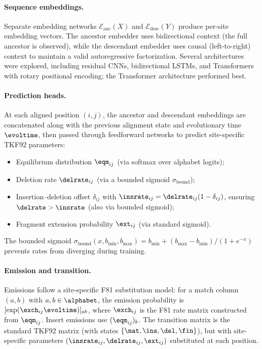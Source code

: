 \paragraph{Sequence embeddings.}
Separate embedding networks $\mathcal{E}_{\mathrm{anc}}(X)$
and $\mathcal{E}_{\mathrm{desc}}(Y)$
produce per-site embedding vectors.
The ancestor embedder uses bidirectional context
(the full ancestor is observed),
while the descendant embedder uses causal (left-to-right) context
to maintain a valid autoregressive factorization.
Several architectures were explored, including residual CNNs,
bidirectional LSTMs, and Transformers with rotary positional encoding;
the Transformer architecture performed best.

\paragraph{Prediction heads.}
At each aligned position $(i, j)$,
the ancestor and descendant embeddings are concatenated
along with the previous alignment state and evolutionary time $\evoltime$,
then passed through feedforward networks to predict site-specific TKF92 parameters:
\begin{itemize}[nosep]
\item Equilibrium distribution $\eqm_{ij}$ (via softmax over alphabet logits);
\item Deletion rate $\delrate_{ij}$ (via a bounded sigmoid $\sigma_{\mathrm{bound}}$);
\item Insertion--deletion offset $\delta_{ij}$ with $\insrate_{ij} = \delrate_{ij}(1 - \delta_{ij})$,
  ensuring $\delrate > \insrate$ (also via bounded sigmoid);
\item Fragment extension probability $\ext_{ij}$ (via standard sigmoid).
\end{itemize}
The bounded sigmoid $\sigma_{\mathrm{bound}}(x, b_{\min}, b_{\max})
= b_{\min} + (b_{\max} - b_{\min}) / (1 + e^{-x})$
prevents rates from diverging during training.

\paragraph{Emission and transition.}
Emissions follow a site-specific F81 substitution model:
for a match column $(a, b)$ with $a, b \in \alphabet$,
the emission probability is $[\exp(\exch_{ij} \evoltime)]_{ab}$,
where $\exch_{ij}$ is the F81 rate matrix constructed from $\eqm_{ij}$.
Insert emissions use $(\eqm_{ij})_b$.
The transition matrix is the standard TKF92 matrix
(with states $\{ \mat, \ins, \del, \fin \}$),
but with site-specific parameters $(\insrate_{ij}, \delrate_{ij}, \ext_{ij})$
substituted at each position.

